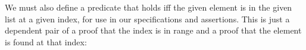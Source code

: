 \documentclass[sigplan]{acmart}%
\begin{document}
\begin{code}
\>[2]\AgdaSpace{}%
\AgdaSymbol{:}\AgdaSpace{}%
\AgdaSymbol{(}\AgdaSpace{}%
\AgdaSymbol{:}\AgdaSpace{}%
\AgdaSpace{}%
\AgdaSymbol{)\{}\AgdaSpace{}%
\AgdaSymbol{:}\AgdaSpace{}%
\AgdaSymbol{\}}\AgdaSpace{}%
\AgdaSpace{}%
\AgdaSpace{}%
\AgdaOperator{\AgdaFunction{<}}\AgdaSpace{}%
\AgdaSpace{}%
\AgdaSpace{}%
\AgdaSpace{}%
\AgdaSpace{}%
\AgdaSpace{}%
\AgdaSpace{}%
\<%
\\
%
\>[2]\AgdaSpace{}%
\AgdaSymbol{(}\AgdaSpace{}%
\AgdaSpace{}%
\AgdaSymbol{)}\AgdaSpace{}%
\AgdaSymbol{\{}\AgdaSymbol{\}}\AgdaSpace{}%
\AgdaSpace{}%
\AgdaSpace{}%
\AgdaSymbol{=}\AgdaSpace{}%
\AgdaSpace{}%
\AgdaSpace{}%
\<%
\\
%
\>[2]\AgdaSpace{}%
\AgdaSymbol{(}\AgdaSpace{}%
\AgdaSpace{}%
\AgdaSymbol{)}\AgdaSpace{}%
\AgdaSymbol{\{}\AgdaSpace{}%
\AgdaSymbol{\}}\AgdaSpace{}%
\AgdaSymbol{(}\AgdaSpace{}%
\AgdaSymbol{)}\AgdaSpace{}%
\AgdaSpace{}%
\AgdaSymbol{=}\AgdaSpace{}%
\AgdaSpace{}%
\AgdaSpace{}%
\AgdaSymbol{(}\AgdaSpace{}%
\AgdaOperator{\AgdaFunction{[}}\AgdaSpace{}%
\AgdaSpace{}%
\AgdaOperator{\AgdaFunction{]≔}}\AgdaSpace{}%
\AgdaSymbol{)}\<%
\end{code}
We must also define a predicate that holds iff the given element 
is in the given list at a given index, for use in our 
specifications and assertions. This is just a dependent pair 
of a proof that the index is in range and a proof that the element 
is found at that index:
\end{document}
